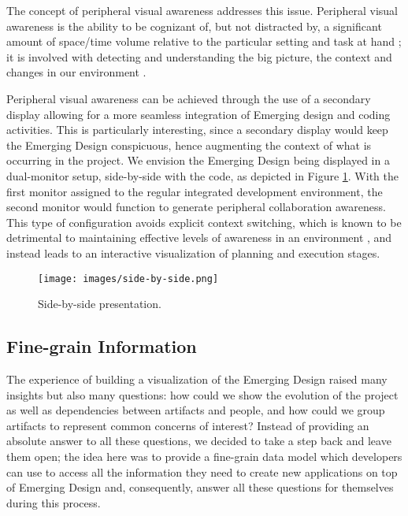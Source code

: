 \documentclass[10pt, conference, compsocconf]{IEEEtran}
\begin{document}
The concept of peripheral visual awareness addresses this issue. Peripheral visual awareness is the ability to be cognizant of, but not distracted by, a significant amount of space/time volume relative to the particular setting and task at hand \cite{Gallop:1996}; it is involved with detecting and understanding the big picture, the context and changes in our environment \cite{Gallop:1996}.

Peripheral visual awareness can be achieved through the use of a secondary display allowing for a more seamless integration of Emerging design and coding activities.  This is particularly interesting, since a secondary display would keep the Emerging Design conspicuous, hence augmenting the context of what is occurring in the project. We envision the Emerging Design being displayed in a dual-monitor setup, side-by-side with the code, as depicted in Figure \ref{fig:side-by-side}.  With the first monitor assigned to the regular integrated development environment, the second monitor would function to generate peripheral collaboration awareness.  This type of configuration avoids explicit context switching, which is known to be detrimental to maintaining effective levels of awareness in an environment \cite{daSilva:2006,Speier:1997}, and instead leads to an interactive visualization of planning and execution stages.  

\begin{figure}[!t]
	\centering
		\texttt{[image: images/side-by-side.png]}
	\caption{Side-by-side presentation.}
	\label{fig:side-by-side}
\end{figure} 

\subsection{Fine-grain Information}

The experience of building a visualization of the Emerging Design raised many insights but also many questions: how could we show the evolution of the project as well as dependencies between artifacts and people, and how could we group artifacts to represent common concerns of interest? Instead of providing an absolute answer to all these questions, we decided to take a step back and leave them open; the idea here was to provide a fine-grain data model which developers can use to access all the information they need to create new applications on top of Emerging Design and, consequently, answer all these questions for themselves during this process.
\end{document}
